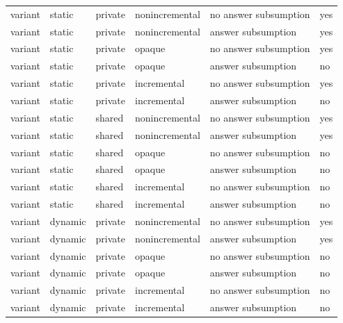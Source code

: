 \begin{table}
\begin{center}
{\footnotesize
\begin{tabular}{llllll}\hline \hline
variant &	    static & 	   private &	  nonincremental &      no answer subsumption  &  yes \\
variant &	    static &	   private &	  nonincremental &      answer subsumption     &  yes \\
variant	&	    static &	   private &      opaque &             no answer subsumption  &  yes \\
variant &	    static &	   private &	  opaque &	      answer subsumption &	no \\
variant &	    static &	   private &	  incremental &         no answer subsumption &	yes \\
variant &	    static &	   private &      incremental &         answer subsumption &	no \\
variant &	    static &	   shared &	  nonincremental &      no answer subsumption &	yes \\
variant &	    static &	   shared &	  nonincremental &      answer subsumption &	yes \\
variant &	    static &	   shared &	  opaque &	      no answer subsumption &	no \\
variant &	    static &	   shared &	  opaque &	      answer subsumption &	no \\
variant &	    static &	   shared &	  incremental &       no answer subsumption &	no \\
variant &	    static &	   shared &	  incremental &          answer subsumption &	no \\
variant &	    dynamic &	   private &	  nonincremental &      no answer subsumption &	yes \\
variant &	    dynamic &	   private &	  nonincremental &      answer subsumption &	yes \\
variant &	    dynamic &	   private &	  opaque &	      no answer subsumption &	no \\
variant &	    dynamic &	   private &	  opaque &	      answer subsumption &	no \\
variant &	    dynamic &	   private &	  incremental &         no answer subsumption &	no \\
variant &	    dynamic &	   private &	  incremental &         answer subsumption &	no \\

\end{tabular}}
\end{center}
\end{table}
